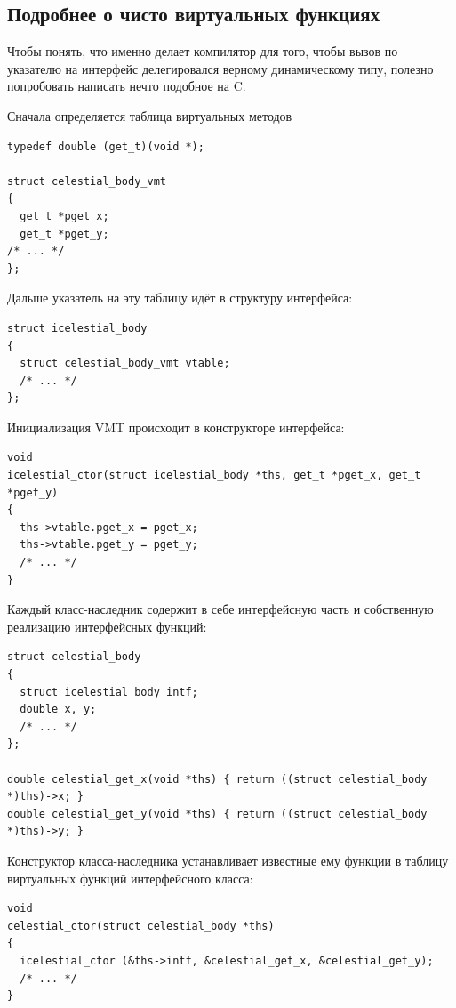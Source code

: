 \documentclass[a4paper,12pt,oneside]{book}
\begin{document}
\subsection{Подробнее о чисто виртуальных функциях}\label{VirtualUnderHood}

Чтобы понять, что именно делает компилятор для того, чтобы вызов по указателю на интерфейс делегировался верному динамическому типу, полезно попробовать написать нечто подобное на C.

Сначала определяется таблица виртуальных методов

\begin{lstlisting}
typedef double (get_t)(void *);

struct celestial_body_vmt
{
  get_t *pget_x;
  get_t *pget_y;
/* ... */
};
\end{lstlisting}

Дальше указатель на эту таблицу идёт в структуру интерфейса:

\begin{lstlisting}
struct icelestial_body
{
  struct celestial_body_vmt vtable;
  /* ... */
};
\end{lstlisting}

Инициализация VMT происходит в конструкторе интерфейса:

\begin{lstlisting}
void
icelestial_ctor(struct icelestial_body *ths, get_t *pget_x, get_t *pget_y)
{
  ths->vtable.pget_x = pget_x;
  ths->vtable.pget_y = pget_y;
  /* ... */
}
\end{lstlisting}

Каждый класс-наследник содержит в себе интерфейсную часть и собственную реализацию интерфейсных функций:

\begin{lstlisting}
struct celestial_body
{
  struct icelestial_body intf;
  double x, y;
  /* ... */
};

double celestial_get_x(void *ths) { return ((struct celestial_body *)ths)->x; }
double celestial_get_y(void *ths) { return ((struct celestial_body *)ths)->y; }
\end{lstlisting}

Конструктор класса-наследника устанавливает известные ему функции в таблицу виртуальных функций интерфейсного класса:

\begin{lstlisting}
void 
celestial_ctor(struct celestial_body *ths)
{
  icelestial_ctor (&ths->intf, &celestial_get_x, &celestial_get_y);
  /* ... */  
}
\end{lstlisting}
\end{document}
